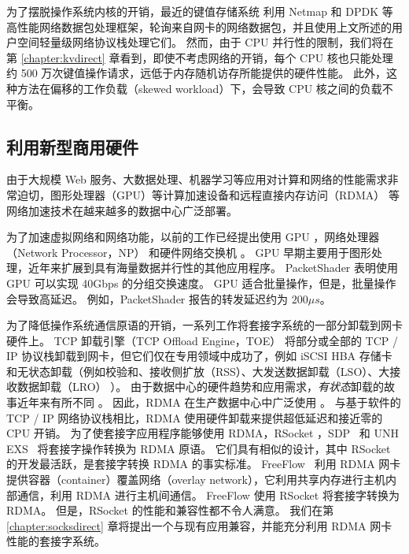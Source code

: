 为了摆脱操作系统内核的开销，最近的键值存储系统  \cite {kapoor2012chronos,ousterhout2010case,ousterhout2015ramcloud,lim2014mica,li2016full} 利用 Netmap \cite {rizzo2012netmap} 和 DPDK \cite{intel2014data} 等高性能网络数据包处理框架，轮询来自网卡的网络数据包，并且使用上文所述的用户空间轻量级网络协议栈处理它们。
然而，由于 CPU 并行性的限制，我们将在第 \ref{chapter:kvdirect} 章看到，即使不考虑网络的开销，每个 CPU 核也只能处理约 500 万次键值操作请求，远低于内存随机访存所能提供的硬件性能。
此外，这种方法在偏移的工作负载（skewed workload）下，会导致 CPU 核之间的负载不平衡。





\subsection{利用新型商用硬件}


由于大规模 Web 服务、大数据处理、机器学习等应用对计算和网络的性能需求非常迫切，图形处理器（GPU）等计算加速设备和远程直接内存访问（RDMA） \cite{infiniband2000infiniband} 等网络加速技术在越来越多的数据中心广泛部署。

为了加速虚拟网络和网络功能，以前的工作已经提出使用 GPU \cite {packetshader}，网络处理器（Network Processor，NP） \cite {cavium,netronome} 和硬件网络交换机 \cite {duet}。
GPU 早期主要用于图形处理，近年来扩展到具有海量数据并行性的其他应用程序。
PacketShader \cite {packetshader} 表明使用 GPU 可以实现 40Gbps 的分组交换速度。
GPU 适合批量操作，但是，批量操作会导致高延迟。
例如，PacketShader \cite {packetshader} 报告的转发延迟约为 $200 \mu{}s$。

为了降低操作系统通信原语的开销，一系列工作将套接字系统的一部分卸载到网卡硬件上。
TCP 卸载引擎（TCP Offload Engine，TOE） \cite {tcp-chimney-offload} 将部分或全部的 TCP / IP 协议栈卸载到网卡，但它们仅在专用领域中成功了，例如 iSCSI HBA 存储卡 \cite {iscsi-hba} 和无状态卸载（例如校验和、接收侧扩放（RSS）、大发送数据卸载（LSO）、大接收数据卸载（LRO） \cite {lsolro}）。
由于数据中心的硬件趋势和应用需求，\emph {有状态}卸载的故事近年来有所不同 \cite {chuanxiong-rdma-keynote}。
因此，RDMA \cite {infiniband2000infiniband} 在生产数据中心中广泛使用 \cite {guo2016rdma}。
与基于软件的 TCP / IP 网络协议栈相比，RDMA 使用硬件卸载来提供超低延迟和接近零的 CPU 开销。
为了使套接字应用程序能够使用 RDMA，RSocket \cite {rsockets}，SDP~ \cite {socketsdirect} 和 UNH EXS~ \cite {russell2008extended} 将套接字操作转换为 RDMA 原语。
它们具有相似的设计，其中 RSocket 的开发最活跃，是套接字转换 RDMA 的事实标准。
FreeFlow~ \cite {nsdi19freeflow} 利用 RDMA 网卡提供容器（container）覆盖网络（overlay network），它利用共享内存进行主机内部通信，利用 RDMA 进行主机间通信。
FreeFlow 使用 RSocket 将套接字转换为 RDMA。
但是，RSocket 的性能和兼容性都不令人满意。
我们在第 \ref{chapter:socksdirect} 章将提出一个与现有应用兼容，并能充分利用 RDMA 网卡性能的套接字系统。

